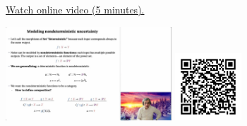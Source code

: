 
\begin{minipage}{10cm}
    \href{https://act4e-spring21.netlify.app/videos/spring2021-monads-a:modeling-nondet-unc.html}{Watch online video (5 minutes).}
        
    \href{https://act4e-spring21.netlify.app/videos/spring2021-monads-a:modeling-nondet-unc.html}{\includegraphics[height=3.5cm]{spring2021-monads-a:modeling-nondet-unc/thumbnails.jpg}}
    \href{https://act4e-spring21.netlify.app/videos/spring2021-monads-a:modeling-nondet-unc.html}{\includegraphics[height=2.5cm]{spring2021-monads-a:modeling-nondet-unc/qrcode.png}}
\end{minipage}
